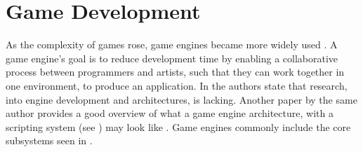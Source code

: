 \section{Game Development} \label{sec:game-development}
As the complexity of games rose, game engines became more widely used \cite{blow2004game}. A game engine's goal is to reduce development time by enabling a collaborative process between programmers and artists, such that they can work together in one environment, to produce an application.
In \cite{Anderson:2008:CRG:1496984.1497031} the authors state that research, into engine development and architectures, is lacking. Another paper by the same author provides a good overview of what a game engine architecture, with a scripting system (see ) may look like \cite{5962102}. Game engines commonly include the core subsystems seen in .

